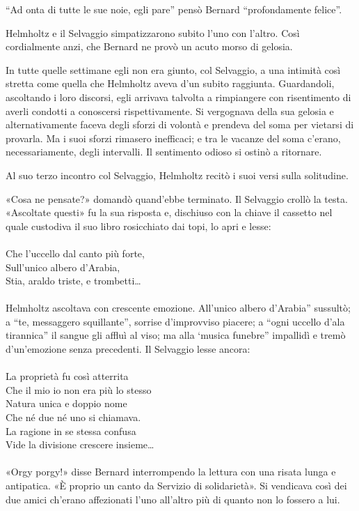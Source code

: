 \documentclass[
a5paper, %
10pt, %
twoside, 
onecolumn, %
openany, %
]{memoir}
\begin{document}
“Ad onta di tutte le sue noie, egli pare” pensò Bernard “profondamente felice”.

Helmholtz e il Selvaggio simpatizzarono subito l’uno con l’altro. Così cordialmente anzi, che Bernard ne provò un acuto morso di gelosia.

In tutte quelle settimane egli non era giunto, col Selvaggio, a una intimità così stretta come quella che Helmholtz aveva d’un subito raggiunta. Guardandoli, ascoltando i loro discorsi, egli arrivava talvolta a rimpiangere con risentimento di averli condotti a conoscersi rispettivamente. Si vergognava della sua gelosia e alternativamente faceva degli sforzi di volontà e prendeva del soma per vietarsi di provarla. Ma i suoi sforzi rimasero inefficaci; e tra le vacanze del soma c’erano, necessariamente, degli intervalli. Il sentimento odioso si ostinò a ritornare.

Al suo terzo incontro col Selvaggio, Helmholtz recitò i suoi versi sulla solitudine.

«Cosa ne pensate?» domandò quand’ebbe terminato. Il Selvaggio crollò la testa. «Ascoltate questi» fu la sua risposta e, dischiuso con la chiave il cassetto nel quale custodiva il suo libro rosicchiato dai topi, lo apri e lesse:
\leavevmode\\\leavevmode\\
{\tiny Che l’uccello dal canto più forte,\\
Sull’unico albero d’Arabia,\\
Stia, araldo triste, e trombetti…}
\leavevmode\\\leavevmode\\
Helmholtz ascoltava con crescente emozione. All’unico albero d’Arabia” sussultò; a “te, messaggero squillante”, sorrise d’improvviso piacere; a “ogni uccello d’ala tirannica” il sangue gli affluì al viso; ma alla ‘musica funebre” impallidì e tremò d’un’emozione senza precedenti. Il Selvaggio lesse ancora:
\leavevmode\\\leavevmode\\
{\tiny La proprietà fu così atterrita\\
Che il mio io non era più lo stesso\\
Natura unica e doppio nome\\
Che né due né uno si chiamava.\\
La ragione in se stessa confusa\\
Vide la divisione crescere insieme…}
\leavevmode\\\leavevmode\\
«Orgy porgy!» disse Bernard interrompendo la lettura con una risata lunga e antipatica. «È proprio un canto da Servizio di solidarietà». Si vendicava così dei due amici ch’erano affezionati l’uno all’altro più di quanto non lo fossero a lui.
\end{document}
